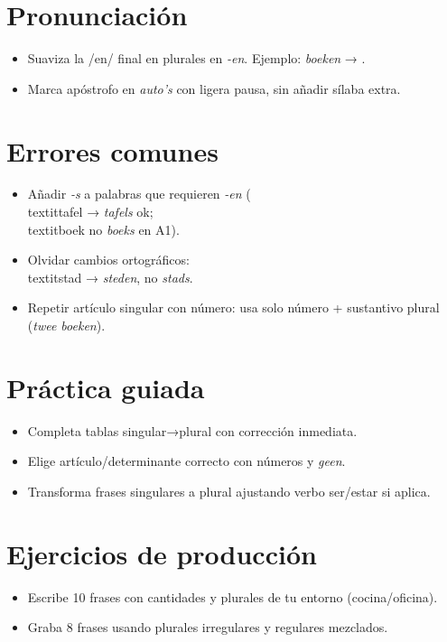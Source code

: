 \section{Pronunciación}
\begin{itemize}[leftmargin=*]
	\item Suaviza la /en/ final en plurales en \textit{-en}. Ejemplo: \textit{boeken} → .
	\item Marca apóstrofo en \textit{auto's} con ligera pausa, sin añadir sílaba extra.
\end{itemize}

\section{Errores comunes}
\begin{itemize}[leftmargin=*]
	\item Añadir \textit{-s} a palabras que requieren \textit{-en} (\\textit{tafel} → \textit{tafels} ok; \\textit{boek} no \textit{boeks} en A1).
	\item Olvidar cambios ortográficos: \\textit{stad} → \textit{steden}, no \textit{stads}.
	\item Repetir artículo singular con número: usa solo número + sustantivo plural (\textit{twee boeken}).
\end{itemize}

\section{Práctica guiada}
\begin{itemize}[leftmargin=*]
	\item Completa tablas singular→plural con corrección inmediata.
	\item Elige artículo/determinante correcto con números y \textit{geen}.
	\item Transforma frases singulares a plural ajustando verbo ser/estar si aplica.
\end{itemize}

\section{Ejercicios de producción}
\begin{itemize}[leftmargin=*]
	\item Escribe 10 frases con cantidades y plurales de tu entorno (cocina/oficina).
	\item Graba 8 frases usando plurales irregulares y regulares mezclados.
\end{itemize}

